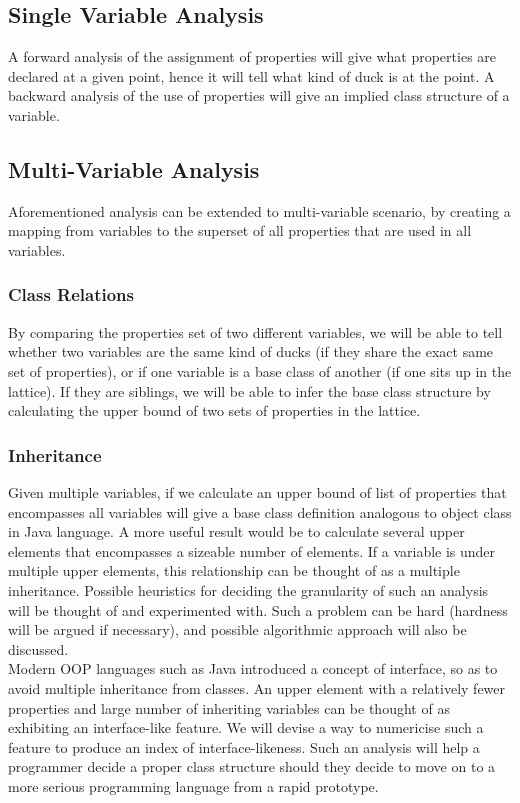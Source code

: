 \documentclass[a4paper,12pt]{article}
\begin{document}
\subsection{Single Variable Analysis}
A forward analysis of the assignment of properties will give what properties are declared at a given point, hence it will tell what kind of duck is at the point. A backward analysis of the use of properties will give an implied class structure of a variable.\\
\subsection{Multi-Variable Analysis}
Aforementioned analysis can be extended to multi-variable scenario, by creating a mapping from variables to the superset of all properties that are used in all variables.
\subsubsection{Class Relations}
By comparing the properties set of two different variables, we will be able to tell whether two variables are the same kind of ducks (if they share the exact same set of properties), or if one variable is a base class of another (if one sits up in the lattice). If they are siblings, we will be able to infer the base class structure by calculating the upper bound of two sets of properties in the lattice.
\subsubsection{Inheritance}
Given multiple variables, if we calculate an upper bound of list of properties that encompasses all variables will give a base class definition analogous to object class in Java language. A more useful result would be to calculate several upper elements that encompasses a sizeable number of elements. If a variable is under multiple upper elements, this relationship can be thought of as a multiple inheritance. Possible heuristics for deciding the granularity of such an analysis will be thought of and experimented with. Such a problem can be hard (hardness will be argued if necessary), and possible algorithmic approach will also be discussed.\\
Modern OOP languages such as Java introduced a concept of interface, so as to 
avoid multiple inheritance from classes. An upper element with a relatively 
fewer properties and large number of inheriting variables can be thought of 
as exhibiting an interface-like feature. We will devise a way to numericise 
such a feature to produce an index of interface-likeness. Such an analysis 
will help a programmer decide a proper class structure should they decide to 
move on to a more serious programming language from a rapid prototype.
\end{document}
